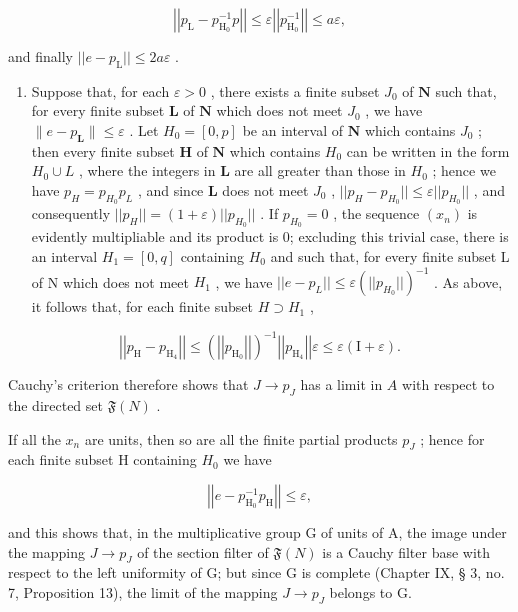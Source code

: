 \[
\left| \left| p _ {\mathrm{L}} - p _ {\mathrm{H} _ {0}} ^ {- 1} p \right| \right| \leqslant \varepsilon \left| \left| p _ {\mathrm{H} _ {0}} ^ {- 1} \right| \right| \leqslant a \varepsilon ,
\]

and finally \(||e - p_{\mathrm{L}}|| \leqslant 2a\varepsilon\) .

\begin{enumerate}
\def\labelenumi{\alph{enumi})}
\setcounter{enumi}{1}
\tightlist
\item
  Suppose that, for each \(\varepsilon > 0\) , there exists a finite subset \(J_0\) of \(\mathbf{N}\) such that, for every finite subset \(\mathbf{L}\) of \(\mathbf{N}\) which does not meet \(J_0\) , we have \(\|e - p_{\mathbf{L}}\| \leqslant \varepsilon\) . Let \(H_0 = [0, p]\) be an interval of \(\mathbf{N}\) which contains \(J_0\) ; then every finite subset \(\mathbf{H}\) of \(\mathbf{N}\) which contains \(H_0\) can be written in the form \(H_0 \cup L\) , where the integers in \(\mathbf{L}\) are all greater than those in \(H_0\) ; hence we have \(p_H = p_{H_0}p_L\) , and since \(\mathbf{L}\) does not meet \(J_0\) , \(||p_H - p_{H_0}|| \leqslant \varepsilon ||p_{H_0}||\) , and consequently \(||p_H|| = (1 + \varepsilon)||p_{H_0}||\) . If \(p_{H_0} = 0\) , the sequence \((x_n)\) is evidently multipliable and its product is 0; excluding this trivial case, there is an interval \(H_1 = [0, q]\) containing \(H_0\) and such that, for every finite subset L of N which does not meet \(H_1\) , we have \(||e - p_L|| \leqslant \varepsilon (||p_{H_0}||)^{-1}\) . As above, it follows that, for each finite subset \(H \supset H_1\) ,
\end{enumerate}

\[
\left| \left| p _ {\mathrm{H}} - p _ {\mathrm{H} _ {4}} \right| \right| \leqslant \left(\left| \left| p _ {\mathrm{H} _ {0}} \right| \right|\right) ^ {- 1} \left| \left| p _ {\mathrm{H} _ {4}} \right| \right| \varepsilon \leqslant \varepsilon (\mathrm{I} + \varepsilon).
\]

Cauchy's criterion therefore shows that \(J \to p_J\) has a limit in \(A\) with respect to the directed set \(\mathfrak{F}(N)\) .

If all the \(x_{n}\) are units, then so are all the finite partial products \(p_{J}\) ; hence for each finite subset H containing \(H_{0}\) we have

\[
\left| \left| e - p _ {\mathrm{H} _ {0}} ^ {- 1} p _ {\mathrm{H}} \right| \right| \leqslant \varepsilon ,
\]

and this shows that, in the multiplicative group G of units of A, the image under the mapping \(J \rightarrow p_{J}\) of the section filter of \(\mathfrak{F}(N)\) is a Cauchy filter base with respect to the left uniformity of G; but since G is complete (Chapter IX, § 3, no. 7, Proposition 13), the limit of the mapping \(J \rightarrow p_{J}\) belongs to G.

